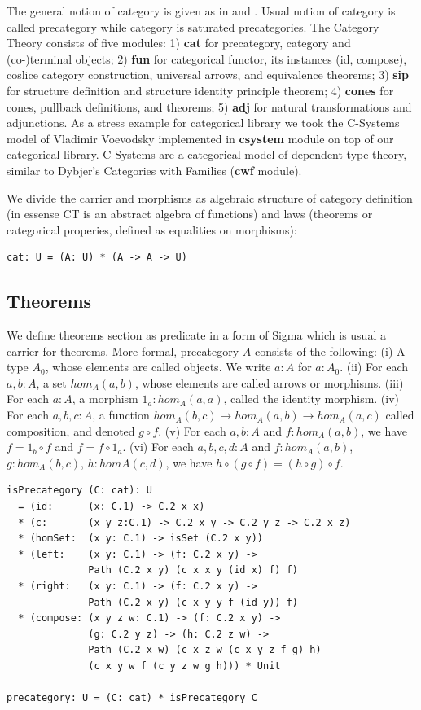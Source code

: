 \documentclass{article}
\begin{document}
The general notion of category is given as in \cite{Shulman15} and \cite{HoTT}.
Usual notion of category is called precategory while category is saturated precategories.
The Category Theory consists of five modules: 1) {\bf cat} for precategory, category and (co-)terminal objects;
2) {\bf fun} for categorical functor, its instances (id, compose), coslice category construction,
universal arrows, and equivalence theorems; 3) {\bf sip} for structure definition and
structure identity principle theorem; 4) {\bf cones} for cones, pullback definitions, and theorems;
5) {\bf adj} for natural transformations and adjunctions. As a stress example for categorical library
we took the C-Systems model of Vladimir Voevodsky implemented in {\bf csystem} module on
top of our categorical library. C-Systems are a categorical model of dependent type theory,
similar to Dybjer's Categories with Families ({\bf cwf} module).

We divide the carrier and morphisms as algebraic structure of category
definition (in essense CT is an abstract algebra of functions) and laws (theorems
or categorical properies, defined as equalities on morphisms):

\begin{lstlisting}[mathescape=true]
cat: U = (A: U) * (A -> A -> U)
\end{lstlisting}

\subsection{Theorems}

We define theorems section as predicate in a form of Sigma
which is usual a carrier for theorems. More formal, precategory $A$ consists of the following:
(i)   A type $A_0$, whose elements are called objects. We write $a: A$ for $a: A_0$.
(ii)  For each $a,b: A$, a set $hom_A(a,b)$, whose elements are called arrows or morphisms.
(iii) For each $a: A$, a morphism $1_a : hom_A(a,a)$, called the identity morphism.
(iv)  For each $a,b,c: A$, a function $hom_A(b,c) \rightarrow hom_A(a,b) \rightarrow hom_A(a,c)$
      called composition, and denoted $g \circ f$.
(v)   For each $a,b: A$ and $f: hom_A(a,b)$, we have $f = 1_b \circ f$ and $f = f \circ 1_a$.
(vi)  For each $a,b,c,d: A$ and $f: hom_A(a,b)$, $g: hom_A(b,c)$, $h: homA(c,d)$,
      we have $h \circ (g \circ f ) = (h \circ g) \circ f$.

\begin{lstlisting}[mathescape=true]
isPrecategory (C: cat): U
  = (id:      (x: C.1) -> C.2 x x)
  * (c:       (x y z:C.1) -> C.2 x y -> C.2 y z -> C.2 x z)
  * (homSet:  (x y: C.1) -> isSet (C.2 x y))
  * (left:    (x y: C.1) -> (f: C.2 x y) ->
              Path (C.2 x y) (c x x y (id x) f) f)
  * (right:   (x y: C.1) -> (f: C.2 x y) ->
              Path (C.2 x y) (c x y y f (id y)) f)
  * (compose: (x y z w: C.1) -> (f: C.2 x y) ->
              (g: C.2 y z) -> (h: C.2 z w) ->
              Path (C.2 x w) (c x z w (c x y z f g) h)
              (c x y w f (c y z w g h))) * Unit

precategory: U = (C: cat) * isPrecategory C
\end{lstlisting}
\end{document}
